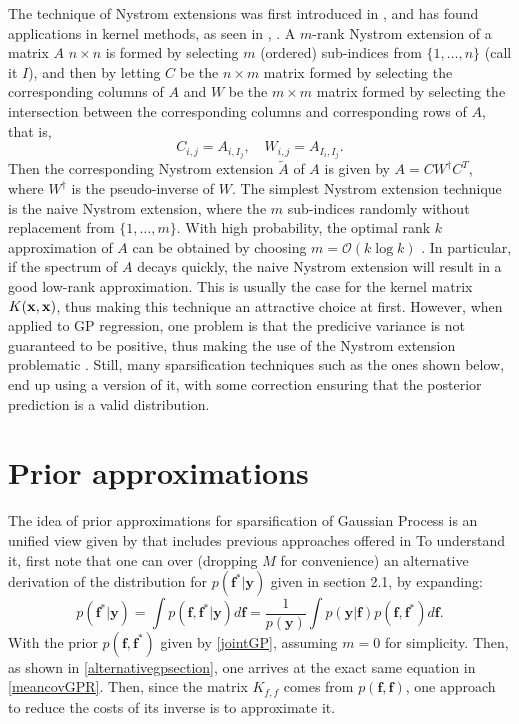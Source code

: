 The technique of Nystrom extensions was first introduced in \cite{Williams01usingthe}, and has found applications in kernel methods, as seen in \cite{Fowlkes_2004}, \cite{Wang_2009}. A $m$-rank Nystrom extension of a matrix $A$ $n \times n$ is formed by selecting $m$ (ordered) sub-indices from $\{1,\ldots,n\}$ (call it $I$), and then by letting $C$ be the $n \times m$ matrix formed by selecting the corresponding columns of $A$ and $W$ be the $m \times m$ matrix formed by selecting the intersection between the corresponding columns and corresponding rows of $A$, that is, 
\begin{displaymath}
C_{i,j} = A_{i,I_j}, \quad W_{i,j} = A_{I_i,I_j}.
\end{displaymath}
Then the corresponding Nystrom extension $\tilde{A}$ of $A$ is given by $A = C W^\dagger C^T$, where $W^\dagger$ is the pseudo-inverse of $W$. The simplest Nystrom extension technique is the naive Nystrom extension, where the $m$ sub-indices randomly without replacement from $\{1,\ldots,m\}$. With high probability, the optimal rank $k$ approximation of $A$ can be obtained by choosing $m = \mathcal{O}(k \log k)$ \cite{Gittens_2011}. In particular, if the spectrum of $A$ decays quickly, the naive Nystrom extension will result in a good low-rank approximation. This is usually the case for the kernel matrix $K({\mathbf x},{\mathbf x})$, thus making this technique an attractive choice  at first. However, when applied to GP regression, one problem is that the predicive variance is not guaranteed to be positive, thus making the use of the Nystrom extension problematic \cite{Candela_2005}. Still, many sparsification techniques such as the ones shown below, end up using a version of it, with some correction ensuring that the posterior prediction is a valid distribution.


\section{Prior approximations}
The idea of prior approximations for sparsification of Gaussian Process is an unified view given by \cite{Candela_2005} that includes previous approaches offered in \cite{Smola_2001,Seeger_2003,Snelson_2006} To understand it, first note that one can over (dropping $M$ for convenience) an alternative derivation of the distribution for $p(\mathbf{f}^*|\mathbf{y})$ given in section 2.1, by expanding: 
\begin{equation} \label{GPRalternative}
p(\mathbf{f}^*|\mathbf{y}) = \int p(\mathbf{f},\mathbf{f}^*|\mathbf{y}) d \mathbf{f} 
= \frac{1}{p(\mathbf{y})} \int p(\mathbf{y}|\mathbf{f}) p(\mathbf{f},\mathbf{f}^*) d \mathbf{f}.
\end{equation} 
With the prior $p(\mathbf{f},\mathbf{f}^*)$ given by \eqref{jointGP}, assuming $m = 0$ for simplicity. Then, as shown in \ref{alternativegpsection}, one arrives at the exact same equation in \eqref{meancovGPR}. Then, since the matrix $K_{f,f}$ comes from $p(\mathbf{f},\mathbf{f})$, one approach to reduce the costs of its inverse is to approximate it.

